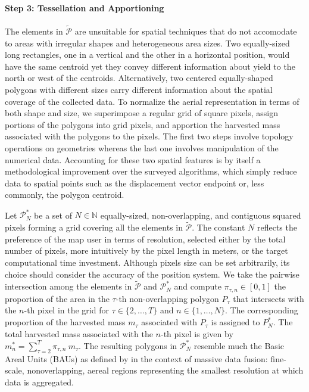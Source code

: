 \paragraph*{Step 3: Tessellation and Apportioning}  The elements in $\tilde{\mathcal{P}}$ are
unsuitable for spatial techniques that do not accomodate to areas with
irregular shapes and heterogeneous area sizes. Two equally-sized long
rectangles, one in a vertical and the other in a horizontal position,
would have the same centroid yet they convey different information
about yield to the north or west of the centroids. Alternatively, two
centered equally-shaped polygons with different sizes carry different
information about the spatial coverage of the collected data. To
normalize the aerial representation in terms of both shape and size,
we superimpose a regular grid of square pixels, assign portions of the
polygons into grid pixels, and apportion the harvested mass associated
with the polygons to the pixels. The first two steps involve topology
operations on geometries whereas the last one involves manipulation of
the numerical data. Accounting for these two spatial features is by
itself a methodological improvement over the surveyed algorithms,
which simply reduce data to spatial points such as the displacement
vector endpoint or, less commonly, the polygon centroid.

 Let $\mathcal{P}^{*}_N$ be
a set of $N \in \mathbb{N}$ equally-sized, non-overlapping, and
contiguous squared pixels forming a grid covering all the elements in
$\tilde{\mathcal{P}}$. The constant $N$ reflects the preference of the
map user in terms of resolution, selected either by the total number
of pixels, more intuitively by the pixel length in meters, or the
target computational time investment. Although pixels size can be set
arbitrarily, its choice should consider the accuracy of the position
system. We take the pairwise intersection among the elements in
$\tilde{\mathcal{P}}$ and $\mathcal{P}^{*}_N$ and compute $\pi_{\tau,
n} \in [0, 1]$ the proportion of the area in the $\tau$-th
non-overlapping polygon $P_{\tau}$ that intersects with the $n$-th
pixel in the grid for $\tau \in \{2, \dots, T\}$ and $n \in \{1,
\dots, N\}$. The corresponding proportion of the harvested mass
$m_{\tau}$ associated with $P_{\tau}$ is assigned to $P^{*}_N$. The
total harvested mass associated with the $n$-th pixel is given by
$m^{*}_n = \sum_{\tau = 2}^{T} \pi_{\tau, n} \ m_{\tau}$. The
resulting polygons in $\mathcal{P}^{*}_N$ resemble much the Basic
Areal Units (BAUs) as defined by \cite{Nguyen2012} in the context of
massive data fusion: fine-scale, nonoverlapping, aereal regions
representing the smallest resolution at which data is aggregated.

